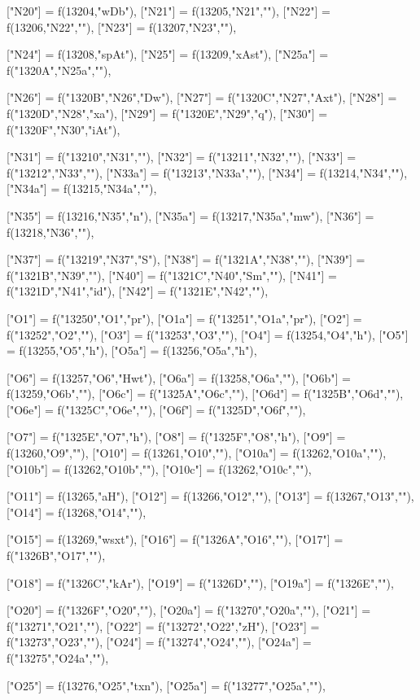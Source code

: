\documentclass{article}
\begin{document}
\begin{luacode*}
{	["N20"] = f(13204,"wDb"),
	["N21"] = f(13205,"N21",""),
	["N22"] = f(13206,"N22",""),
	["N23"] = f(13207,"N23",""),

	["N24"] = f(13208,"spAt"),
	["N25"] = f(13209,"xAst"),
	["N25a"] = f("1320A","N25a",""),

	["N26"] = f("1320B","N26","Dw"),
	["N27"] = f("1320C","N27","Axt"),
	["N28"] = f("1320D","N28","xa"),
	["N29"] = f("1320E","N29","q"),
	["N30"] = f("1320F","N30","iAt"),

	["N31"] = f("13210","N31",""),
	["N32"] = f("13211","N32",""),
	["N33"] = f("13212","N33",""),
	["N33a"] = f("13213","N33a",""),
	["N34"] = f(13214,"N34",""),
	["N34a"] = f(13215,"N34a",""),


	["N35"] = f(13216,"N35","n"),
	["N35a"] = f(13217,"N35a","mw"),
	["N36"] = f(13218,"N36",""),

	["N37"] = f("13219","N37","S"),
	["N38"] = f("1321A","N38",""),
	["N39"] = f("1321B","N39",""),
	["N40"] = f("1321C","N40","Sm",""),
	["N41"] = f("1321D","N41","id"),
	["N42"] = f("1321E","N42",""),


	["O1"] = f("13250","O1","pr"),
	["O1a"] = f("13251","O1a","pr"),
	["O2"] = f("13252","O2",""),
	["O3"] = f("13253","O3",""),
	["O4"] = f(13254,"O4","h"),
	["O5"] = f(13255,"O5","h"),
	["O5a"] = f(13256,"O5a","h"),

	["O6"] = f(13257,"O6","Hwt"),
	["O6a"] = f(13258,"O6a",""),
	["O6b"] = f(13259,"O6b",""),
	["O6c"] = f("1325A","O6c",""),
	["O6d"] = f("1325B","O6d",""),
	["O6e"] = f("1325C","O6e",""),
	["O6f"] = f("1325D","O6f",""),

	["O7"] = f("1325E","O7","h"),
	["O8"] = f("1325F","O8","h"),
	["O9"] = f(13260,"O9",""),
	["O10"] = f(13261,"O10",""),
	["O10a"] = f(13262,"O10a",""),
	["O10b"] = f(13262,"O10b",""),
	["O10c"] = f(13262,"O10c",""),

	["O11"] = f(13265,"aH"),
	["O12"] = f(13266,"O12",""),
	["O13"] = f(13267,"O13",""),
	["O14"] = f(13268,"O14",""),


	["O15"] = f(13269,"wsxt"),
	["O16"] = f("1326A","O16",""),
	["O17"] = f("1326B","O17",""),

	["O18"] = f("1326C","kAr"),
	["O19"] = f("1326D",""),
	["O19a"] = f("1326E",""),

	["O20"] = f("1326F","O20",""),
	["O20a"] = f("13270","O20a",""),
	["O21"] = f("13271","O21",""),
	["O22"] = f("13272","O22","zH"),
	["O23"] = f("13273","O23",""),
	["O24"] = f("13274","O24",""),
	["O24a"] = f("13275","O24a",""),

	["O25"] = f(13276,"O25","txn"),
	["O25a"] = f("13277","O25a",""),

}
\end{luacode*}
\end{document}
